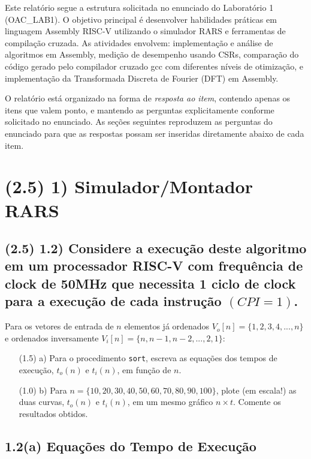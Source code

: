\documentclass[12pt,a4paper]{article}
\begin{document}
Este relatório segue a estrutura solicitada no enunciado do Laboratório 1 (OAC\_LAB1). O objetivo principal é desenvolver habilidades práticas em linguagem Assembly RISC-V utilizando o simulador RARS e ferramentas de compilação cruzada. As atividades envolvem: implementação e análise de algoritmos em Assembly, medição de desempenho usando CSRs, comparação do código gerado pelo compilador cruzado gcc com diferentes níveis de otimização, e implementação da Transformada Discreta de Fourier (DFT) em Assembly.

O relatório está organizado na forma de \emph{resposta ao item}, contendo apenas os itens que valem ponto, e mantendo as perguntas explicitamente conforme solicitado no enunciado. As seções seguintes reproduzem as perguntas do enunciado para que as respostas possam ser inseridas diretamente abaixo de cada item.

\section*{(2.5) 1) Simulador/Montador RARS}

\subsection*{(2.5) 1.2) Considere a execução deste algoritmo em um processador RISC-V com frequência de clock de 50MHz que necessita 1 ciclo de clock para a execução de cada instrução $(CPI=1)$.}
Para os vetores de entrada de $n$ elementos já ordenados $V_{o}[n]=\{1,2,3,4,...,n\}$ e ordenados inversamente $V_{i}[n]=\{n,n-1,n-2,...,2,1\}$:

\begin{enumerate}
    \item[(1.5) a)] Para o procedimento \texttt{sort}, escreva as equações dos tempos de execução, $t_{o}(n)$ e $t_{i}(n)$, em função de $n$.
    \item[(1.0) b)] Para $n=\{10,20,30,40,50,60,70,80,90,100\}$, plote (em escala!) as duas curvas, $t_{o}(n)$ e $t_{i}(n)$, em um mesmo gráfico $n \times t$. Comente os resultados obtidos.
\end{enumerate}


\subsection*{1.2(a) Equações do Tempo de Execução}
\end{document}
